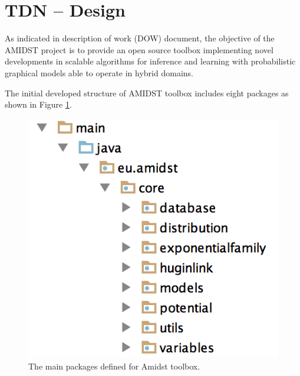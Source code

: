 \section{TDN -- Design}\label{sec:design}



As indicated in description of work (DOW) document, the objective of the AMIDST project is to provide an open source toolbox implementing novel developments in scalable algorithms for inference and learning with probabilistic graphical models able to operate in hybrid domains. 

The initial developed structure of AMIDST toolbox includes eight packages as shown in Figure \ref{Figure:ToolboxStructure}.

\begin{figure}[ht!]
\begin{center}
\includegraphics[scale=0.85]{./figures/ToolboxStructure} 
\caption{\label{Figure:ToolboxStructure} The main packages defined for Amidst toolbox.}
\end{center}
\end{figure}